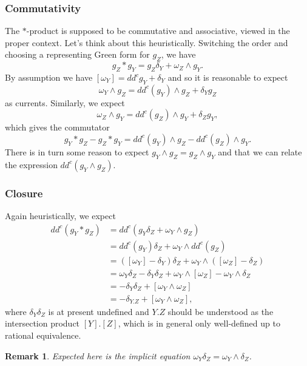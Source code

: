\documentclass[11pt]{beamer}
\newtheorem{remark}{Remark}
\begin{document}
\begin{frame}
\frametitle{Commutativity}
The $*$-product is supposed to be commutative and associative, viewed in the proper context. Let's think about this heuristically. Switching the order and choosing a representing Green form for $g_Z$, we have 
$$g_Z*g_Y=g_Z\delta_Y+\omega_Z\wedge g_Y.$$
By assumption we have $[\omega_Y]=dd^cg_Y+\delta_Y$ and so it is reasonable to expect 
$$\omega_Y\wedge g_Z=dd^c(g_Y)\wedge g_Z+\delta_Yg_Z$$
as currents. Similarly, we expect 
$$\omega_Z\wedge g_Y=dd^c(g_Z)\wedge g_Y+\delta_Zg_Y,$$
which gives the commutator
$$g_Y*g_Z-g_Z*g_Y=dd^c(g_Y)\wedge g_Z-dd^c(g_Z)\wedge g_Y.$$
There is in turn some reason to expect $g_Y\wedge g_Z=g_Z\wedge g_Y$ and that we can relate the expression $dd^c(g_Y\wedge g_Z)$.
\end{frame}

\begin{frame}
\frametitle{Closure}
Again heuristically, we expect
\begin{align*}
dd^c(g_Y*g_Z)
&=dd^c(g_Y\delta_Z+\omega_Y\wedge g_Z) \\
&=dd^c(g_Y)\delta_Z+\omega_Y\wedge dd^c(g_Z) \\
&=([\omega_Y]-\delta_Y)\delta_Z+\omega_Y\wedge([\omega_Z]-\delta_Z) \\
&=\omega_Y\delta_Z-\delta_Y\delta_Z+\omega_Y\wedge[\omega_Z]-\omega_Y\wedge\delta_Z \\
&=-\delta_Y\delta_Z+[\omega_Y\wedge\omega_Z] \\
&=-\delta_{Y.Z}+[\omega_Y\wedge\omega_Z],
\end{align*}
where $\delta_Y\delta_Z$ is at present undefined and $Y.Z$ should be understood as the intersection product $[Y].[Z]$, which is in general only well-defined up to rational equivalence. 

\begin{remark}
Expected here is the implicit equation $\omega_Y\delta_Z=\omega_Y\wedge\delta_Z$.
\end{remark}
\end{frame}
\end{document}

